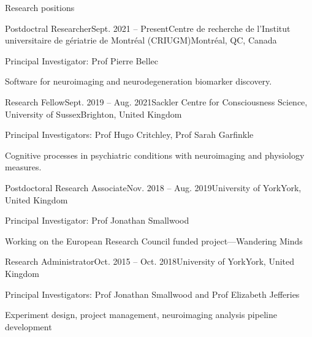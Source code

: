 \documentclass{resume} %
\begin{document}
%

%

\begin{rSection}{Research positions}

  \begin{rSubsection}{Postdoctral Researcher}{Sept. 2021 -- Present}{Centre de recherche de l'Institut universitaire de g\'eriatrie de Montr\'eal (CRIUGM)}{Montr\'eal, QC, Canada}
    \item Principal Investigator: Prof Pierre Bellec
    \item Software for neuroimaging and neurodegeneration biomarker discovery.
  \end{rSubsection}

  \begin{rSubsection}{Research Fellow}{Sept. 2019 -- Aug. 2021}{Sackler Centre for Consciousness Science, University of Sussex}{Brighton, United Kingdom}
    \item Principal Investigators: Prof Hugo Critchley, Prof Sarah Garfinkle
    \item Cognitive processes in psychiatric conditions with neuroimaging and physiology measures.
  \end{rSubsection}

  \begin{rSubsection}{Postdoctoral Research Associate}{Nov. 2018 -- Aug. 2019}{University of York}{York, United Kingdom}
  \item Principal Investigator: Prof Jonathan Smallwood
  \item Working on the European Research Council funded project---Wandering Minds
  \end{rSubsection}

  \begin{rSubsection}{Research Administrator}{Oct. 2015 -- Oct. 2018}{University of York}{York, United Kingdom}
    \item Principal Investigators: Prof Jonathan Smallwood and Prof Elizabeth Jefferies
    \item Experiment design, project management, neuroimaging analysis pipeline development
  \end{rSubsection}

  \end{rSection}
\end{document}
